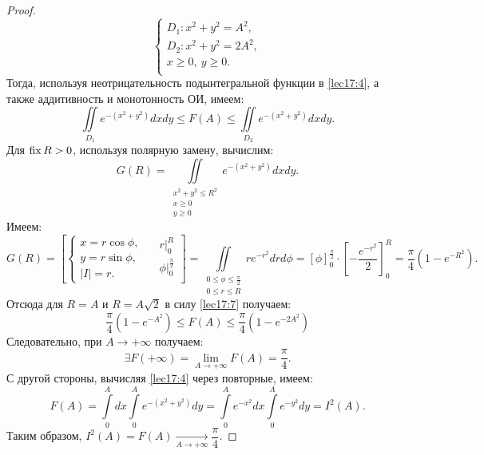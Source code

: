 \documentclass[../../main.tex]{subfiles}
\begin{document}
\begin{proof}
     \begin{equation}
		 	\label{lec17:6}
            \begin{cases}
                D_1 : x^2 + y^2 = A^2,\\
                D_2 : x^2 + y^2 = 2A^2,\\
                x \geq 0,\ y \geq 0.\\
            \end{cases}
		\end{equation}
  Тогда, используя неотрицательность подынтегральной 
  функции в \eqref{lec17:4}, а также аддитивность и монотонность ОИ, имеем:
	\begin{equation}
		\label{lec17:7}
		\iint\limits_{D_1}e^{-(x^2 + y^2)}dxdy \leq F(A) \leq
		\iint\limits_{D_2}e^{-(x^2 + y^2)}dxdy.
	\end{equation}
    Для $\operatorname{fix} R > 0$, используя полярную замену, вычислим:
	\begin{equation}
        \label{lec17:8}
		G(R) = \iint\limits_{\substack{
		x^2 + y^2 \leq R^2 \\
		x \geq 0 \\
		y \geq 0
		}}e^{-(x^2 + y^2)}dxdy.
	\end{equation}
	Имеем:
    \begin{equation*}
        G(R) =
        \left[
		\left\{
        \begin{gathered} 
        x = r \cos \phi,\\
        y = r \sin \phi,\\
        |I| = r.
        \end{gathered}
        \right. \quad
        \begin{gathered}
        r\vert_0^R\\
		\phi \vert_0^{\frac{\pi}{2}}\\
        \end{gathered}
        \right]
        = \iint\limits_{\substack{0\leq\phi\leq \frac{\pi}{2}\\
				0 \leq r \leq R}}r e^{-r^2}drd\phi =
        \left[ \phi \right]_0^{\frac{\pi}{2}} \cdot
        \left[ -\frac{e^{-r^2}}{2} \right]_0^{R} =
        \frac{\pi}{4}(1 - e^{-R^2}).
	\end{equation*}
	Отсюда для $R = A$ и $R = A\sqrt{2}$ в силу \eqref{lec17:7} получаем:
	\begin{equation}
	 \frac{\pi}{4}(1 - e^{-A^2}) \leq F(A) \leq
	 \frac{\pi}{4}(1 - e^{-2A^2})
	\end{equation}
    Следовательно, при $A \to +\infty$ получаем:
    \begin{equation}
    \exists F(+\infty)=\lim\limits_{A\to+\infty}F(A) = \frac{\pi}{4}.
    \end{equation}
    С другой стороны, вычисляя \eqref{lec17:4} через повторные, имеем:
    \begin{equation*}
     F(A)= \int\limits_0^{A}dx\int\limits_0^{A}e^{-(x^2+y^2)}dy = 
     \int\limits_0^{A}e^{-x^2}dx \int\limits_0^{A}e^{-y^2}dy = I^2(A).
    \end{equation*}
    Таким образом, $I^2(A) =
    F(A) \xrightarrow[A\to +\infty]{} \dfrac{\pi}{4}$.
    

\end{proof}
\end{document}
